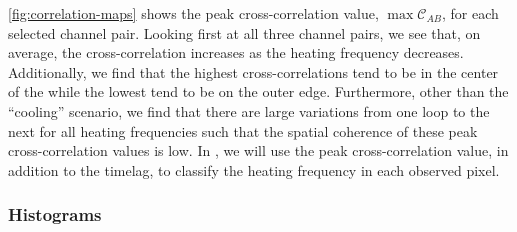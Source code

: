 \autoref{fig:correlation-maps} shows the peak cross-correlation value, $\max\mathcal{C}_{AB}$, for each selected channel pair. Looking first at all three channel pairs, we see that, on average, the cross-correlation increases as the heating frequency decreases. Additionally, we find that the highest cross-correlations tend to be in the center of the \AR{} while the lowest tend to be on the outer edge. Furthermore, other than the ``cooling'' scenario, we find that there are large variations from one loop to the next for all heating frequencies such that the spatial coherence of these peak cross-correlation values is low. In , we will use the peak cross-correlation value, in addition to the timelag, to classify the heating frequency in each observed pixel. 

\subsubsection{Histograms}\label{timelag_histograms}

